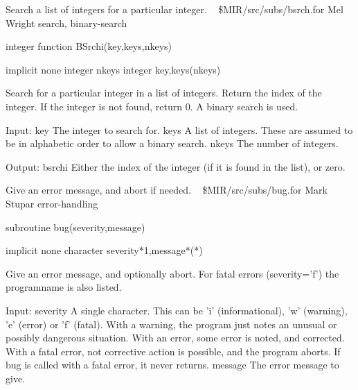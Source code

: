 %
\noindent Search a list of integers for a particular integer.
\newline \ 
\newline {} \$MIR/src/subs/bsrch.for
\newline {} Mel Wright
\newline {} search, binary-search
\par{\tenpoint
{\eightpoint\begintt
        integer function BSrchi(key,keys,nkeys)

        implicit none
        integer nkeys
        integer key,keys(nkeys)

  Search for a particular integer in a list of integers. Return the
  index of the integer. If the integer is not found, return 0.
  A binary search is used.

  Input:
    key        The integer to search for.
    keys       A list of integers. These are assumed to be in alphabetic
               order to allow a binary search.
    nkeys      The number of integers.

  Output:
    bsrchi     Either the index of the integer (if it is found in the
               list), or zero.
\endtt}
\par}
%
\noindent Give an error message, and abort if needed.
\newline \ 
\newline {} \$MIR/src/subs/bug.for
\newline {} Mark Stupar
\newline \abox{Keywords:} error-handling
\par{\tenpoint
{\eightpoint\begintt
        subroutine bug(severity,message)

        implicit none
        character severity*1,message*(*)

  Give an error message, and optionally abort.
  For fatal errors (severity='f') the programname is also listed.

  Input:
    severity   A single character. This can be 'i' (informational),
               'w' (warning), 'e' (error) or 'f' (fatal). 
               With a warning, the program just notes an
               unusual or possibly dangerous situation. With an error,
               some error is noted, and corrected. With a fatal error,
               not corrective action is possible, and the program aborts.
               If bug is called with a fatal error, it never returns.
    message    The error message to give.
\endtt}
\par}
